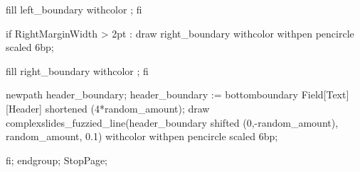        fill left_boundary withcolor ;
     fi

     if RightMarginWidth > 2pt :
        draw right_boundary 
           withcolor 
           withpen pencircle scaled 6bp;

       fill right_boundary withcolor ;
     fi

     newpath header_boundary;
     header_boundary := bottomboundary Field[Text][Header] shortened (4*random_amount);
     draw complexslides_fuzzied_line(header_boundary shifted (0,-random_amount),
                                     random_amount, 0.1)
           withcolor 
           withpen pencircle scaled 6bp;

  fi;
  endgroup;
  StopPage;
\stopuseMPgraphic


\setupbackgrounds[\v!page][\c!background={complexslides:pagebackground}]


\protect

\stopmodule
